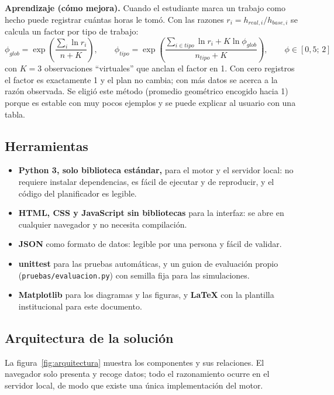 \textbf{Aprendizaje (cómo mejora).} Cuando el estudiante marca un trabajo como hecho puede registrar cuántas horas le tomó. Con las razones $r_i=h_{real,i}/h_{base,i}$ se calcula un factor por tipo de trabajo:
\begin{equation}
\phi_{glob}=\exp\!\left(\frac{\sum_i \ln r_i}{n+K}\right),\qquad
\phi_{tipo}=\exp\!\left(\frac{\sum_{i\in tipo}\ln r_i + K\ln\phi_{glob}}{n_{tipo}+K}\right),\qquad \phi\in[0{,}5;\,2]
\end{equation}
con $K=3$ observaciones ``virtuales'' que anclan el factor en 1. Con cero registros el factor es exactamente 1 y el plan no cambia; con más datos se acerca a la razón observada. Se eligió este método (promedio geométrico encogido hacia 1) porque es estable con muy pocos ejemplos y se puede explicar al usuario con una tabla.



\subsection{Herramientas}

\begin{itemize}
    \item \textbf{Python 3, solo biblioteca estándar,} para el motor y el servidor local: no requiere instalar dependencias, es fácil de ejecutar y de reproducir, y el código del planificador es legible.
    \item \textbf{HTML, CSS y JavaScript sin bibliotecas} para la interfaz: se abre en cualquier navegador y no necesita compilación.
    \item \textbf{JSON} como formato de datos: legible por una persona y fácil de validar.
    \item \textbf{unittest} para las pruebas automáticas, y un guion de evaluación propio (\texttt{pruebas/evaluacion.py}) con semilla fija para las simulaciones.
    \item \textbf{Matplotlib} para los diagramas y las figuras, y \textbf{\LaTeX} con la plantilla institucional para este documento.
\end{itemize}

\subsection{Arquitectura de la solución}

La figura~\ref{fig:arquitectura} muestra los componentes y sus relaciones. El navegador solo presenta y recoge datos; todo el razonamiento ocurre en el servidor local, de modo que existe una única implementación del motor.

